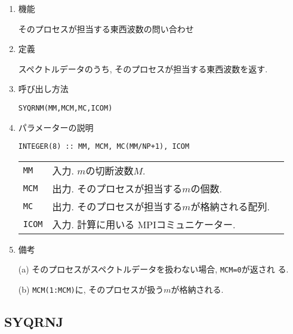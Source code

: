 \documentclass[a4j]{jsarticle}
\begin{document}
\begin{enumerate}

\item 機能 

そのプロセスが担当する東西波数の問い合わせ

\item 定義

スペクトルデータのうち, そのプロセスが担当する東西波数を返す.

\item 呼び出し方法 
    
\texttt{SYQRNM(MM,MCM,MC,ICOM)}
  
\item パラメーターの説明

\begin{verbatim}
INTEGER(8) :: MM, MCM, MC(MM/NP+1), ICOM
\end{verbatim}    

\begin{tabular}{lll}
\texttt{MM} & 入力. $m$の切断波数$M$.\\
\texttt{MCM} & 出力. そのプロセスが担当する$m$の個数.\\
\texttt{MC} & 出力. そのプロセスが担当する$m$が格納される配列.\\
\texttt{ICOM} & 入力. 計算に用いる MPIコミュニケーター.
\end{tabular}

\item 備考

(a) そのプロセスがスペクトルデータを扱わない場合, \texttt{MCM=0}が返され
  る.

(b) \texttt{MCM(1:MCM)}に, そのプロセスが扱う$m$が格納される.

\end{enumerate}


\subsection{SYQRNJ}
\end{document}
